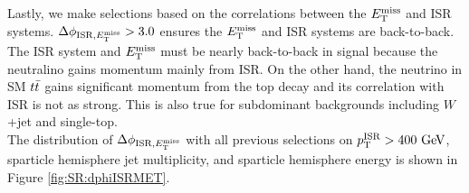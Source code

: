 
\indent Lastly, we make selections based on the correlations between the $E_{\mathrm{T}}^{\mathrm{miss}}$ and ISR systems.  $\Delta\phi_{\mathrm{ISR},E_{\mathrm{T}}^{\mathrm{miss}}} > 3.0$ ensures the $E_{\mathrm{T}}^{\mathrm{miss}}$ and ISR systems are back-to-back.  The ISR system and $E_{\mathrm{T}}^{\mathrm{miss}}$ must be nearly back-to-back in signal because the neutralino gains momentum mainly from ISR.  On the other hand, the neutrino in SM $t\bar{t}$ gains significant momentum from the top decay and its correlation with ISR is not as strong. This is also true for subdominant backgrounds including $W$+jet and single-top. \\

\indent The distribution of $\Delta\phi_{\mathrm{ISR},E_{\mathrm{T}}^{\mathrm{miss}}}$ with all previous selections on $\PTISR > 400 \gev$, sparticle hemisphere jet multiplicity, and sparticle hemisphere energy is shown in Figure \ref{fig:SR:dphiISRMET}. \\  %

